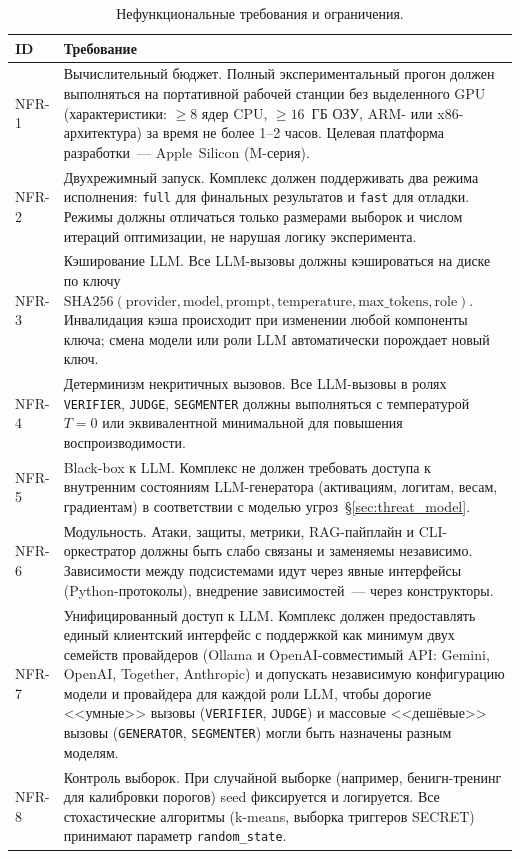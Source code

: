 \documentclass[12pt, a4paper]{article}
\theoremstyle{definition}
\theoremstyle{remark}
\begin{document}
\begin{table}[H]
\centering
\caption{Нефункциональные требования и ограничения.}
\label{tab:nonfunctional_requirements}
\begin{tabular}{|p{}|p{}|}
\hline
\textbf{ID} & \textbf{Требование} \\
\hline
NFR-1 & Вычислительный бюджет. Полный экспериментальный прогон должен выполняться на портативной рабочей станции без выделенного GPU (характеристики: $\geq 8$ ядер CPU, $\geq 16$~ГБ ОЗУ, ARM- или x86-архитектура) за время не более 1--2 часов. Целевая платформа разработки~--- Apple~Silicon (M-серия). \\
\hline
NFR-2 & Двухрежимный запуск. Комплекс должен поддерживать два режима исполнения: \texttt{full} для финальных результатов и \texttt{fast} для отладки. Режимы должны отличаться только размерами выборок и числом итераций оптимизации, не нарушая логику эксперимента. \\
\hline
NFR-3 & Кэширование LLM. Все LLM-вызовы должны кэшироваться на диске по ключу $\mathrm{SHA256}(\text{provider}, \text{model}, \text{prompt}, \text{temperature}, \text{max\_tokens}, \text{role})$. Инвалидация кэша происходит при изменении любой компоненты ключа; смена модели или роли LLM автоматически порождает новый ключ. \\
\hline
NFR-4 & Детерминизм некритичных вызовов. Все LLM-вызовы в ролях \texttt{VERIFIER}, \texttt{JUDGE}, \texttt{SEGMENTER} должны выполняться с температурой $T = 0$ или эквивалентной минимальной для повышения воспроизводимости. \\
\hline
NFR-5 & Black-box к LLM. Комплекс не должен требовать доступа к внутренним состояниям LLM-генератора (активациям, логитам, весам, градиентам) в соответствии с моделью угроз~\S\ref{sec:threat_model}. \\
\hline
NFR-6 & Модульность. Атаки, защиты, метрики, RAG-пайплайн и CLI-оркестратор должны быть слабо связаны и заменяемы независимо. Зависимости между подсистемами идут через явные интерфейсы (Python-протоколы), внедрение зависимостей~--- через конструкторы. \\
\hline
NFR-7 & Унифицированный доступ к LLM. Комплекс должен предоставлять единый клиентский интерфейс с поддержкой как минимум двух семейств провайдеров (Ollama и OpenAI-совместимый API: Gemini, OpenAI, Together, Anthropic) и допускать независимую конфигурацию модели и провайдера для каждой роли LLM, чтобы дорогие <<умные>> вызовы (\texttt{VERIFIER}, \texttt{JUDGE}) и массовые <<дешёвые>> вызовы (\texttt{GENERATOR}, \texttt{SEGMENTER}) могли быть назначены разным моделям. \\
\hline
NFR-8 & Контроль выборок. При случайной выборке (например, бенигн-тренинг для калибровки порогов) seed фиксируется и логируется. Все стохастические алгоритмы (k-means, выборка триггеров SECRET) принимают параметр \texttt{random\_state}. \\
\hline
\end{tabular}
\end{table}
\end{document}
